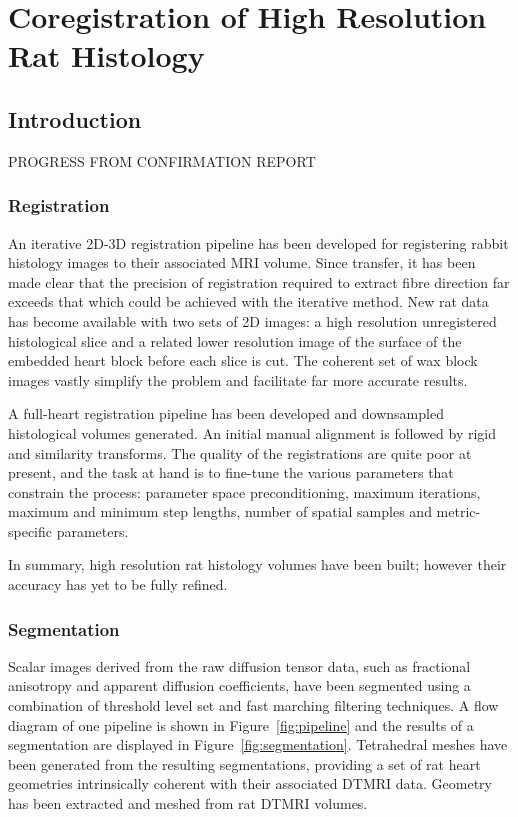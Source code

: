 \chapter{Coregistration of High Resolution Rat Histology}
\dblspace
\begin{quote}{\em }\end{quote}

\section{Introduction}
\label{sec:review:introduction}
PROGRESS FROM CONFIRMATION REPORT 
\subsection{Registration}

An iterative 2D-3D registration pipeline has been developed for registering rabbit histology images to their associated MRI volume. Since transfer, it has been made clear that the precision of registration required to extract fibre direction far exceeds that which could be achieved with the iterative method. New rat data has become available with two sets of 2D images: a high resolution unregistered histological slice and a related lower resolution image of the surface of the embedded heart block before each slice is cut. The coherent set of wax block images vastly simplify the problem and facilitate far more accurate results.

A full-heart registration pipeline has been developed and downsampled histological volumes generated. An initial manual alignment is followed by rigid and similarity transforms. The quality of the registrations are quite poor at present, and the task at hand is to fine-tune the various parameters that constrain the process: parameter space preconditioning, maximum iterations, maximum and minimum step lengths, number of spatial samples and metric-specific parameters.

In summary, high resolution rat histology volumes have been built; however their accuracy has yet to be fully refined.

  \subsection{Segmentation}
    Scalar images derived from the raw diffusion tensor data, such as fractional anisotropy and apparent diffusion coefficients, have been segmented using a combination of threshold level set and fast marching filtering techniques. A flow diagram of one pipeline is shown in Figure~\ref{fig:pipeline} and the results of a segmentation are displayed in Figure~\ref{fig:segmentation}. Tetrahedral meshes have been generated from the resulting segmentations, providing a set of rat heart geometries intrinsically coherent with their associated DTMRI data. 
    Geometry has been extracted and meshed from rat DTMRI volumes.
    
